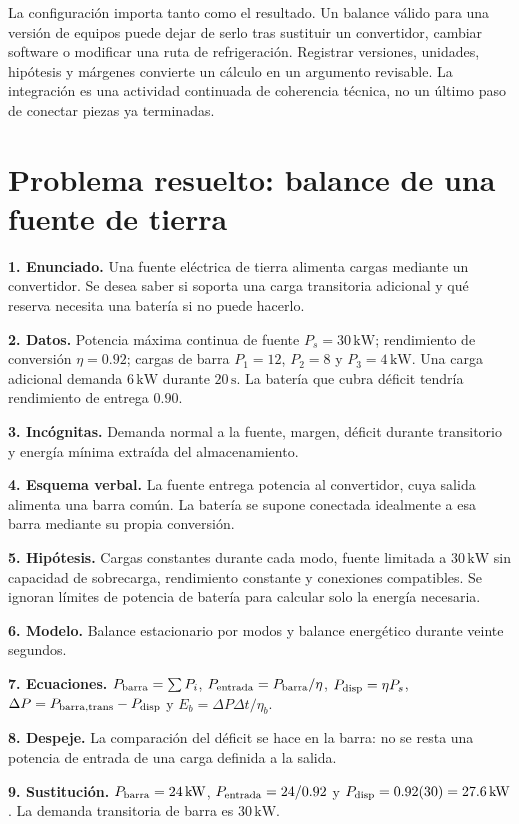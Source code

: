 La configuración importa tanto como el resultado. Un balance válido para una versión de equipos puede dejar de serlo tras sustituir un convertidor, cambiar software o modificar una ruta de refrigeración. Registrar versiones, unidades, hipótesis y márgenes convierte un cálculo en un argumento revisable. La integración es una actividad continuada de coherencia técnica, no un último paso de conectar piezas ya terminadas.

\section{Problema resuelto: balance de una fuente de tierra}
\textbf{1. Enunciado.} Una fuente eléctrica de tierra alimenta cargas mediante un convertidor. Se desea saber si soporta una carga transitoria adicional y qué reserva necesita una batería si no puede hacerlo.

\textbf{2. Datos.} Potencia máxima continua de fuente $P_s=30\,\mathrm{kW}$; rendimiento de conversión $\eta=0.92$; cargas de barra $P_1=12$, $P_2=8$ y $P_3=4\,\mathrm{kW}$. Una carga adicional demanda $6\,\mathrm{kW}$ durante $20\,\mathrm{s}$. La batería que cubra déficit tendría rendimiento de entrega $0.90$.

\textbf{3. Incógnitas.} Demanda normal a la fuente, margen, déficit durante transitorio y energía mínima extraída del almacenamiento.

\textbf{4. Esquema verbal.} La fuente entrega potencia al convertidor, cuya salida alimenta una barra común. La batería se supone conectada idealmente a esa barra mediante su propia conversión.

\textbf{5. Hipótesis.} Cargas constantes durante cada modo, fuente limitada a $30\,\mathrm{kW}$ sin capacidad de sobrecarga, rendimiento constante y conexiones compatibles. Se ignoran límites de potencia de batería para calcular solo la energía necesaria.

\textbf{6. Modelo.} Balance estacionario por modos y balance energético durante veinte segundos.

\textbf{7. Ecuaciones.} $P_{\rm barra}=\sum P_i$, $P_{\rm entrada}=P_{\rm barra}/\eta$, $P_{\rm disp}=\eta P_s$, $\Delta P=P_{\rm barra,trans}-P_{\rm disp}$ y $E_b=\Delta P\Delta t/\eta_b$.

\textbf{8. Despeje.} La comparación del déficit se hace en la barra: no se resta una potencia de entrada de una carga definida a la salida.

\textbf{9. Sustitución.} $P_{\rm barra}=24\,\mathrm{kW}$, $P_{\rm entrada}=24/0.92$ y $P_{\rm disp}=0.92(30)=27.6\,\mathrm{kW}$. La demanda transitoria de barra es $30\,\mathrm{kW}$.

